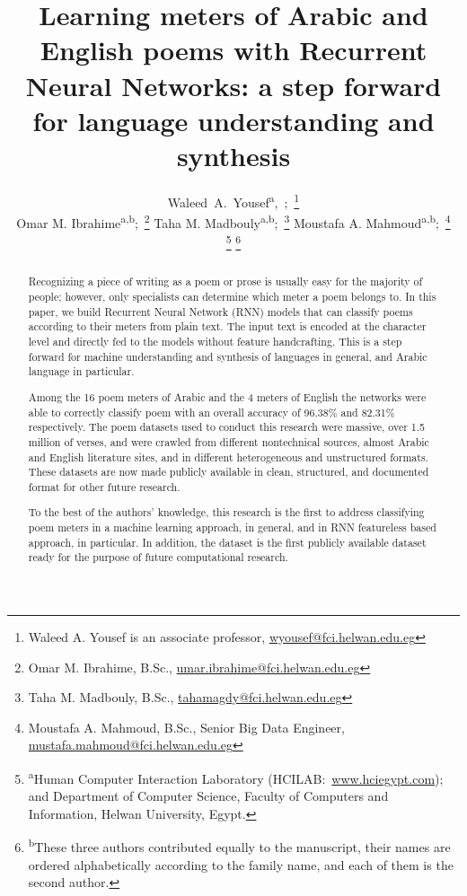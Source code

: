 \documentclass[journal,10pt,twocolumns,letter]{IEEEtran}
\begin{document}


\title{Learning meters of Arabic and English poems with Recurrent Neural Networks: a step forward
  for language understanding and synthesis}

\author{Waleed~A.~Yousef\textsuperscript{a},~;~\thanks{Waleed
    A. Yousef is an associate professor, \protect\url{wyousef@fci.helwan.edu.eg}}

  Omar M. Ibrahime\textsuperscript{a,b};~\thanks{Omar M. Ibrahime, B.Sc., \protect\url{umar.ibrahime@fci.helwan.edu.eg}}
  Taha M. Madbouly\textsuperscript{a,b};~\thanks{Taha M. Madbouly, B.Sc., \protect\url{tahamagdy@fci.helwan.edu.eg}} 
  Moustafa A. Mahmoud\textsuperscript{a,b};~\thanks{Moustafa A. Mahmoud, B.Sc., Senior Big Data Engineer, \protect\url{mustafa.mahmoud@fci.helwan.edu.eg}}



  \thanks{\textsuperscript{a}Human Computer Interaction Laboratory (HCILAB:\
    \protect\url{www.hciegypt.com}); and Department of Computer Science, Faculty of Computers and Information,
    Helwan University, Egypt.}
  \thanks{\textsuperscript{b}These three authors contributed equally
    to the manuscript, their names are ordered alphabetically according to the family name, and each
    of them is the second author.}
}

\maketitle

\begin{abstract}
  Recognizing a piece of writing as a poem or prose is usually easy for the majority of people; however,
  only specialists can determine which meter a poem belongs to. In this paper, we build Recurrent
  Neural Network (RNN) models that can classify poems according to their meters from plain text. The
  input text is encoded at the character level and directly fed to the models without feature
  handcrafting. This is a step forward for machine understanding and synthesis of languages in
  general, and Arabic language in particular.

  Among the 16 poem meters of Arabic and the 4 meters of English the networks were able to correctly
  classify poem with an overall accuracy of 96.38\% and 82.31\% respectively. The poem datasets used to
  conduct this research were massive, over 1.5 million of verses, and were crawled from different
  nontechnical sources, almost Arabic and English literature sites, and in different heterogeneous
  and unstructured formats. These datasets are now made publicly available in clean, structured, and
  documented format for other future research.

  To the best of the authors' knowledge, this research is the first to address classifying poem
  meters in a machine learning approach, in general, and in RNN featureless based approach, in
  particular. In addition, the dataset is the first publicly available dataset ready for the purpose
  of future computational research.
\end{abstract}
\end{document}
